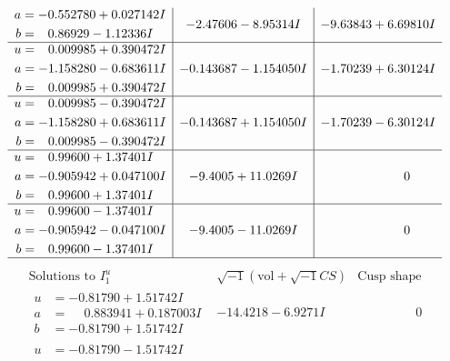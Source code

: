 \documentclass[1p]{elsarticle_modified}
\theoremstyle{definition}
\newcommand{\I}{\sqrt{-1}}
\begin{document}
$$\begin{array}{c|c|c}
\begin{aligned}
a &= -0.552780 + 0.027142 I \\
b &= \phantom{-}0.86929 - 1.12336 I\end{aligned}
 & -2.47606 - 8.95314 I & -9.63843 + 6.69810 I \\ \hline\begin{aligned}
u &= \phantom{-}0.009985 + 0.390472 I \\
a &= -1.158280 - 0.683611 I \\
b &= \phantom{-}0.009985 + 0.390472 I\end{aligned}
 & -0.143687 - 1.154050 I & -1.70239 + 6.30124 I \\ \hline\begin{aligned}
u &= \phantom{-}0.009985 - 0.390472 I \\
a &= -1.158280 + 0.683611 I \\
b &= \phantom{-}0.009985 - 0.390472 I\end{aligned}
 & -0.143687 + 1.154050 I & -1.70239 - 6.30124 I \\ \hline\begin{aligned}
u &= \phantom{-}0.99600 + 1.37401 I \\
a &= -0.905942 + 0.047100 I \\
b &= \phantom{-}0.99600 + 1.37401 I\end{aligned}
 & -9.4005 + 11.0269 I & \phantom{-0.000000 } 0 \\ \hline\begin{aligned}
u &= \phantom{-}0.99600 - 1.37401 I \\
a &= -0.905942 - 0.047100 I \\
b &= \phantom{-}0.99600 - 1.37401 I\end{aligned}
 & -9.4005 - 11.0269 I & \phantom{-0.000000 } 0\\
 \hline 
 \end{array}$$\newpage$$\begin{array}{c|c|c}  
\text{Solutions to }I^u_{1}& \I (\text{vol} + \sqrt{-1}CS) & \text{Cusp shape}\\
 \hline 
\begin{aligned}
u &= -0.81790 + 1.51742 I \\
a &= \phantom{-}0.883941 + 0.187003 I \\
b &= -0.81790 + 1.51742 I\end{aligned}
 & -14.4218 - 6.9271 I & \phantom{-0.000000 } 0 \\ \hline\begin{aligned}
u &= -0.81790 - 1.51742 I \\

\end{aligned}
\end{array}$$
\end{document}
